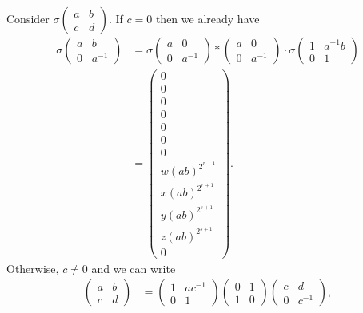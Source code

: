 Consider
$\sigma\left(\begin{matrix} a & b \\ c & d \end{matrix}\right)$.
If $c=0$ then we already have
\begin{align*}
\sigma\left(\begin{matrix} a & b \\ 0 & a^{-1} \end{matrix}\right) &=
\sigma\left(\begin{matrix} a & 0 \\ 0 & a^{-1} \end{matrix}\right) * 
\left(\begin{matrix} a & 0 \\ 0 & a^{-1} \end{matrix}\right)\cdot
\sigma\left(\begin{matrix} 1 & a^{-1}b \\ 0 & 1 \end{matrix}\right) \\
&=
\left( \begin{matrix}
0 \\
0 \\
0 \\
0 \\
0 \\
0 \\
0 \\
w(ab)^{2^{r+1}} \\
x(ab)^{2^{r+1}} \\
y(ab)^{2^{s+1}} \\
z(ab)^{2^{s+1}} \\
0
\end{matrix} \right).
\end{align*}
Otherwise, $c\neq 0$ and we can write
\begin{align*}
\left(\begin{matrix} a & b \\ c & d \end{matrix}\right) &= 
\left(\begin{matrix} 1 & ac^{-1} \\ 0 & 1 \end{matrix}\right)
\left(\begin{matrix} 0 & 1 \\ 1 & 0 \end{matrix}\right)
\left(\begin{matrix} c & d \\ 0 & c^{-1} \end{matrix}\right),
\end{align*}
